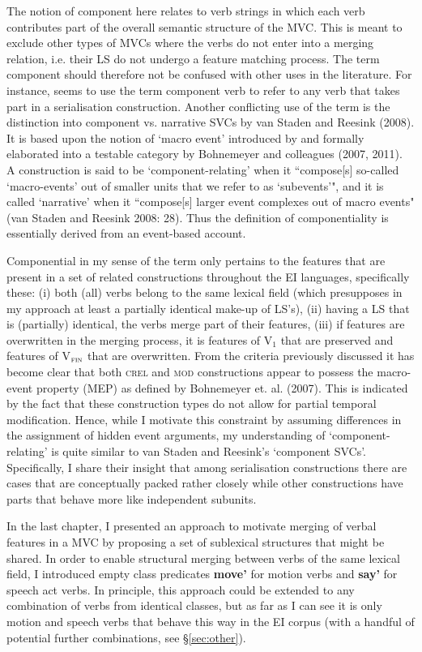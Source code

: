 The notion of component here relates to verb strings in which each verb contributes part of the overall semantic structure of the MVC. This is meant to exclude other types of MVCs where the verbs do not enter into a merging relation, i.e. their LS do not undergo a feature matching process. The term component should therefore not be confused with other uses in the literature. For instance, \textcite{dixon2006serial} seems to use the term component verb to refer to any verb that takes part in a serialisation construction. Another conflicting use of the term is the distinction into component vs. narrative SVCs by van Staden and Reesink (2008). It is based upon the notion of `macro event' introduced by \textcite{talmy2000toward} and formally elaborated into a testable category by Bohnemeyer and colleagues (2007, 2011). A construction is said to be `component-relating' when it ``compose[s] so-called `macro-events’
out of smaller units that we refer to as `subevents’", and it is called `narrative' when it ``compose[s] larger event complexes out of macro events" (van Staden and Reesink 2008: 28). Thus the definition of componentiality is essentially derived from an event-based account. 

Componential in my sense of the term only pertains to the features that are present in a set of related constructions throughout the EI languages, specifically these: (i) both (all) verbs belong to the same lexical field (which presupposes in my approach at least a partially identical make-up of LS's), (ii) having a LS that is (partially) identical, the verbs merge part of their features, (iii) if features are overwritten in the merging process, it is features of V$_{1}$ that are preserved and features of V$_{\textsc{fin}}$ that are overwritten. From the criteria previously discussed it has become clear that both \textsc{crel} and \textsc{mod} constructions appear to possess the macro-event property (MEP) as defined by Bohnemeyer et. al. (2007). This is indicated by the fact that these construction types do not allow for partial temporal modification. Hence, while I motivate this constraint by assuming differences in the assignment of hidden event arguments, my understanding of `component-relating' is quite similar to van Staden and Reesink's `component SVCs'. Specifically, I share their insight that among serialisation constructions there are cases that are conceptually packed rather closely while other constructions have parts that behave more like independent subunits.

In the last chapter, I presented an approach to motivate merging of verbal features in a MVC by proposing a set of sublexical structures that might be shared. In order to enable structural merging between verbs of the same lexical field, I introduced empty class predicates \textbf{move'} for motion verbs and \textbf{say'} for speech act verbs. In principle, this approach could be extended to any combination of verbs from identical classes, but as far as I can see it is only motion and speech verbs that behave this way in the EI corpus (with a handful of potential further combinations, see §\ref{sec:other}). 

